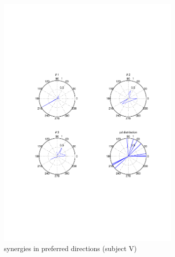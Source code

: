 \begin{figure}[ht]
    \centering
        \includegraphics[width=0.8\textwidth]{images/syn_rose_pro_vega.pdf}
    \caption{synergies in preferred directions (subject V)}
    \label{sg:fig:images_syn_rose_pro_vega}
\end{figure}




